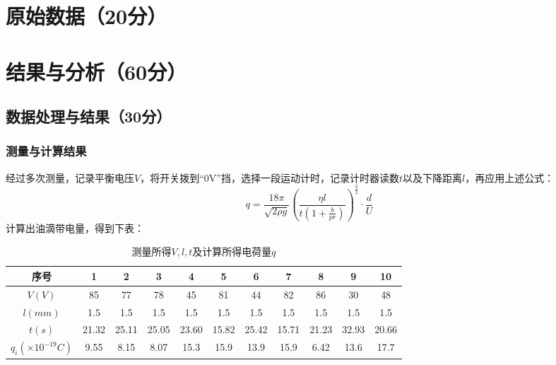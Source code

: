 \documentclass[yuxi]{../../templates/Report}%
\begin{document}
\begin{fullreportonly}
\section{原始数据（20分）}

\section{结果与分析（60分）}
\subsection{数据处理与结果（30分）}
\subsubsection{测量与计算结果}
经过多次测量，记录平衡电压$V$，将开关拨到“0V”挡，选择一段运动计时，记录计时器读数$t$以及下降距离$l$，再应用上述公式：
\[ q = \frac{18\pi}{\sqrt{2\rho g}} \left( \frac{\eta l}{t\left(1 + \frac{b}{pr}\right)} \right)^{\frac{3}{2}} \cdot \frac{d}{U} \]
计算出油滴带电量，得到下表：
\begin{table}[htbp]
  \centering
  \caption{测量所得$V,l,t$及计算所得电荷量$q$}
  \begin{tabular}{@{}ccccccccccc@{}}
    \toprule
    序号 & 1 & 2 & 3 & 4 & 5 & 6 & 7 & 8 & 9 & 10 \\
    \midrule
    \( V(V) \) & 85 & 77 & 78 & 45 & 81 & 44 & 82 & 86 & 30 & 48 \\
    \( l(mm) \) & 1.5 & 1.5 & 1.5 & 1.5 & 1.5 & 1.5 & 1.5 & 1.5 & 1.5 & 1.5 \\
    \( t(s) \) & 21.32 & 25.11 & 25.05 & 23.60 & 15.82 & 25.42 & 15.71 & 21.23 & 32.93 & 20.66 \\
    \( q_i(\times10^{-19}C) \) & 9.55 & 8.15 & 8.07 & 15.3 & 15.9 & 13.9 & 15.9 & 6.42 & 13.6 & 17.7 \\
    \bottomrule
  \end{tabular}
\end{table}


\end{fullreportonly}
\end{document}
